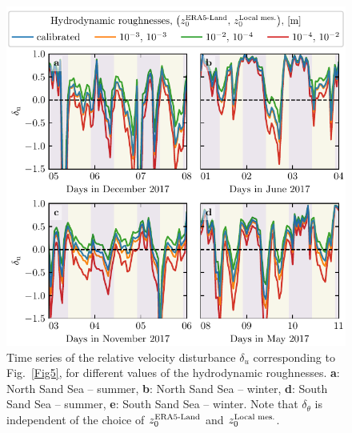 \begin{figure}[p]
\centering
\includegraphics[scale=1]{Figures/Figure14_supp.pdf}
\caption{Time series of the relative velocity disturbance $\delta_{u}$ corresponding to Fig.~\ref{Fig5}, for different values of the hydrodynamic roughnesses. \textbf{a}: North Sand Sea -- summer, \textbf{b}: North Sand Sea -- winter, \textbf{d}: South Sand Sea -- summer, \textbf{e}: South Sand Sea -- winter. Note that $\delta_{\theta}$ is independent of the choice of $z_{0}^{\textup{ERA5-Land}}$ and $z_{0}^{\textup{Local mes.}}$.}
\label{Fig14_supp}
\end{figure}



